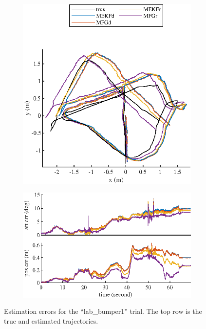 \begin{figure}
	\centering
	\begin{subfigure}{\textwidth}
		\centering
		\includegraphics[scale=1.3]{figures/VIO-VCU_RVI-trajectory1}
	\end{subfigure}
	\begin{subfigure}{\textwidth}
		\centering
		\vspace{1cm}
		\includegraphics[scale=1.3]{figures/VIO-VCU_RVI-error1}
	\end{subfigure}
	\caption[Estimation errors for the ``lab\_bumper1'' trial.]{Estimation errors for the ``lab\_bumper1'' trial. The top row is the true and estimated trajectories.}
	\label{fig:VIO-dataset1}
\end{figure}

